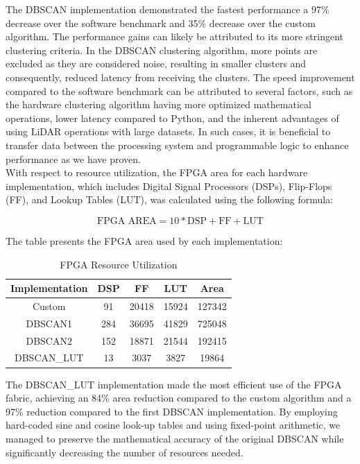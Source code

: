 \documentclass[journal]{IEEEtran} %
\begin{document}
The DBSCAN implementation demonstrated the fastest performance a 97\% decrease over the software benchmark and 35\% decrease over the custom algorithm. The performance gains can likely be attributed to its more stringent clustering criteria. In the DBSCAN clustering algorithm, more points are excluded as they are considered noise, resulting in smaller clusters and consequently, reduced latency from receiving the clusters. The speed improvement compared to the software benchmark can be attributed to several factors, such as the hardware clustering algorithm having more optimized mathematical operations, lower latency compared to Python, and the inherent advantages of using LiDAR operations with large datasets. In such cases, it is beneficial to transfer data between the processing system and programmable logic to enhance performance as we have proven.\\

With respect to resource utilization, the FPGA area for each hardware implementation, which includes Digital Signal Processors (DSPs), Flip-Flops (FF), and Lookup Tables (LUT), was calculated using the following formula:

\[ 
\text{FPGA AREA} = 10 * \text{DSP} + \text{FF} + \text{LUT}
\]

The table presents the FPGA area used by each implementation:

\begin{table}[h]
\centering
\begin{tabular}{|c|c|c|c|c|}
\hline
\textbf{Implementation} & \textbf{DSP} & \textbf{FF} & \textbf{LUT} & \textbf{Area} \\
\hline
Custom & 91 & 20418 & 15924 & 127342 \\
DBSCAN1 & 284 & 36695 & 41829 & 725048 \\
DBSCAN2 & 152 & 18871 & 21544 & 192415 \\
DBSCAN\_LUT & 13 & 3037 & 3827 & 19864 \\
\hline
\end{tabular}
\caption{FPGA Resource Utilization}
\label{table:fpga_resource_utilization}
\end{table}

The DBSCAN\_LUT implementation made the most efficient use of the FPGA fabric, achieving an 84\% area reduction compared to the custom algorithm and a 97\% reduction compared to the first DBSCAN implementation. By employing hard-coded sine and cosine look-up tables and using fixed-point arithmetic, we managed to preserve the mathematical accuracy of the original DBSCAN while significantly decreasing the number of resources needed.
\end{document}
